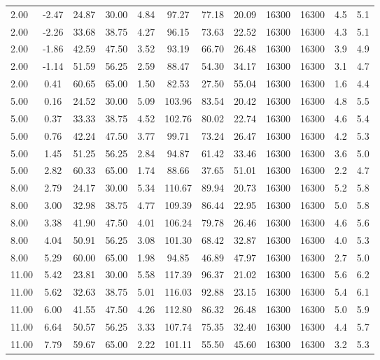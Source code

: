 \documentclass[english]{SPFShortReport}
\begin{document}
\begin{table}[!ht]
\begin{small}
\begin{center}
{\begin{tabular}{l | c c c c c c c c c c c }
2.00 & -2.47 & 24.87 & 30.00 & 4.84 & 97.27 & 77.18 & 20.09 & 16300 & 16300 & 4.5 & 5.1\\ 
2.00 & -2.26 & 33.68 & 38.75 & 4.27 & 96.15 & 73.63 & 22.52 & 16300 & 16300 & 4.3 & 5.1\\ 
2.00 & -1.86 & 42.59 & 47.50 & 3.52 & 93.19 & 66.70 & 26.48 & 16300 & 16300 & 3.9 & 4.9\\ 
2.00 & -1.14 & 51.59 & 56.25 & 2.59 & 88.47 & 54.30 & 34.17 & 16300 & 16300 & 3.1 & 4.7\\ 
2.00 & 0.41 & 60.65 & 65.00 & 1.50 & 82.53 & 27.50 & 55.04 & 16300 & 16300 & 1.6 & 4.4\\ 
5.00 & 0.16 & 24.52 & 30.00 & 5.09 & 103.96 & 83.54 & 20.42 & 16300 & 16300 & 4.8 & 5.5\\ 
5.00 & 0.37 & 33.33 & 38.75 & 4.52 & 102.76 & 80.02 & 22.74 & 16300 & 16300 & 4.6 & 5.4\\ 
5.00 & 0.76 & 42.24 & 47.50 & 3.77 & 99.71 & 73.24 & 26.47 & 16300 & 16300 & 4.2 & 5.3\\ 
5.00 & 1.45 & 51.25 & 56.25 & 2.84 & 94.87 & 61.42 & 33.46 & 16300 & 16300 & 3.6 & 5.0\\ 
5.00 & 2.82 & 60.33 & 65.00 & 1.74 & 88.66 & 37.65 & 51.01 & 16300 & 16300 & 2.2 & 4.7\\ 
8.00 & 2.79 & 24.17 & 30.00 & 5.34 & 110.67 & 89.94 & 20.73 & 16300 & 16300 & 5.2 & 5.8\\ 
8.00 & 3.00 & 32.98 & 38.75 & 4.77 & 109.39 & 86.44 & 22.95 & 16300 & 16300 & 5.0 & 5.8\\ 
8.00 & 3.38 & 41.90 & 47.50 & 4.01 & 106.24 & 79.78 & 26.46 & 16300 & 16300 & 4.6 & 5.6\\ 
8.00 & 4.04 & 50.91 & 56.25 & 3.08 & 101.30 & 68.42 & 32.87 & 16300 & 16300 & 4.0 & 5.3\\ 
8.00 & 5.29 & 60.00 & 65.00 & 1.98 & 94.85 & 46.89 & 47.97 & 16300 & 16300 & 2.7 & 5.0\\ 
11.00 & 5.42 & 23.81 & 30.00 & 5.58 & 117.39 & 96.37 & 21.02 & 16300 & 16300 & 5.6 & 6.2\\ 
11.00 & 5.62 & 32.63 & 38.75 & 5.01 & 116.03 & 92.88 & 23.15 & 16300 & 16300 & 5.4 & 6.1\\ 
11.00 & 6.00 & 41.55 & 47.50 & 4.26 & 112.80 & 86.32 & 26.48 & 16300 & 16300 & 5.0 & 5.9\\ 
11.00 & 6.64 & 50.57 & 56.25 & 3.33 & 107.74 & 75.35 & 32.40 & 16300 & 16300 & 4.4 & 5.7\\ 
11.00 & 7.79 & 59.67 & 65.00 & 2.22 & 101.11 & 55.50 & 45.60 & 16300 & 16300 & 3.2 & 5.3\\ 

\end{tabular}}
\end{center}
\end{small}
\end{table}
\end{document}
